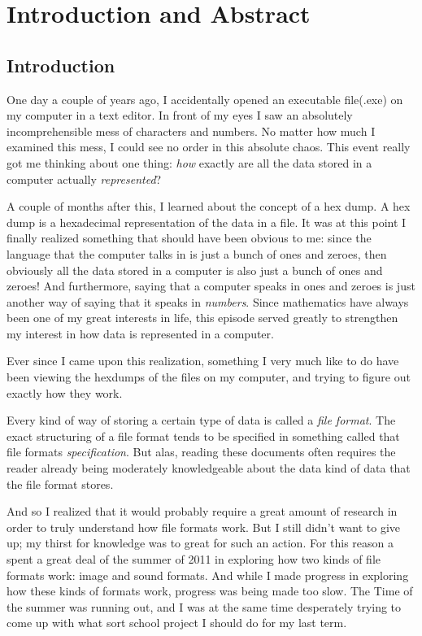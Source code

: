\begin{comment}
  
\end{comment}

\chapter{Introduction and Abstract}

\section{Introduction}

One day a couple of years ago, I accidentally opened an executable
file(.exe) on my computer in a text editor. In front of my eyes I saw
an absolutely incomprehensible mess of characters and numbers. No
matter how much I examined this mess, I could see no order in this
absolute chaos. This event really got me thinking about one thing:
\textit{how} exactly are all the data stored in a computer actually
\textit{represented}?

A couple of months after this, I learned about the concept of a hex
dump. A hex dump is a hexadecimal representation of the data in a
file. It was at this point I finally realized something that should
have been obvious to me: since the language that the computer talks in
is just a bunch of ones and zeroes, then obviously all the data stored
in a computer is also just a bunch of ones and zeroes! And
furthermore, saying that a computer speaks in ones and zeroes is just
another way of saying that it speaks in \textit{numbers}. Since
mathematics have always been one of my great interests in life, this
episode served greatly to strengthen my interest in how data is
represented in a computer.

Ever since I came upon this realization, something I very much like to
do have been viewing the hexdumps of the files on my computer, and
trying to figure out exactly how they work. %

Every kind of way of storing a certain type of data is called a
\textit{file format}. The exact structuring of a file format tends to
be specified in something called that file formats
\textit{specification}. But alas, reading these documents often
requires the reader already being moderately knowledgeable about the
data kind of data that the file format stores.

And so I realized that it would probably require a great amount of
research in order to truly understand how file formats work. But I
still didn't want to give up; my thirst for knowledge was to great for
such an action.  For this reason a spent a great deal of the summer of
2011 in exploring how two kinds of file formats work: image and sound
formats. And while I made progress in exploring how these kinds of
formats work, progress was being made too slow. The Time of the summer
was running out, and I was at the same time desperately trying to come
up with what sort school project I should do for my last term.

